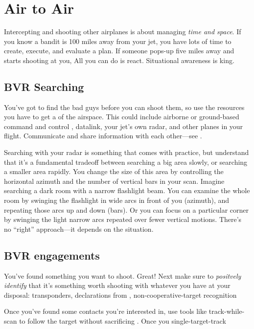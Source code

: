 \chapter{Air to Air}

Intercepting and shooting other airplanes is about managing \emph{time and space}.
If you know a bandit is 100 miles away from your jet,
you have lots of time to create, execute, and evaluate a plan.
If someone pops-up five miles away and starts shooting at you,
All you can do is react.
Situational awareness  is king.

\section{BVR Searching}

You've got to find the bad guys before you can shoot them,
so use the resources you have to get a  of the airspace.
This could include airborne or ground-based command and control
, datalink, your jet's own radar,
and other planes in your flight.
Communicate and share information with each other---see .

Searching with your radar is something that comes with practice,
but understand that it's a fundamental tradeoff between searching a big area
slowly, or searching a smaller area rapidly.
You change the size of this area by controlling the horizontal azimuth
and the number of vertical bars in your scan.
Imagine searching a dark room with a narrow flashlight beam.
You can examine the whole room by swinging the flashlight in wide arcs
in front of you (azimuth), and repeating those arcs up and down (bars).
Or you can focus on a particular corner by swinging the light narrow arcs
repeated over fewer vertical motions.
There's no ``right'' approach---it depends on the situation.

\section{BVR engagements}

You've found something you want to shoot. Great!
Next make sure to \emph{positvely identify}
that it's something worth shooting with whatever you have at your disposal:
 transponders,
declarations from ,
non-cooperative-target recognition 

Once you've found some contacts you're interested in,
use tools like track-while-scan  to follow the target without
sacrificing . Once you single-target-track
